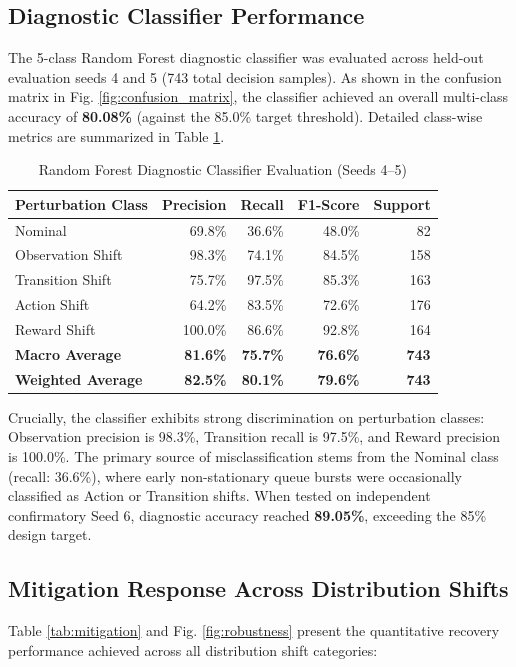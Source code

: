 \documentclass{ieeeaccess}
\begin{document}
\subsection{Diagnostic Classifier Performance}
The 5-class Random Forest diagnostic classifier was evaluated across held-out evaluation seeds 4 and 5 (743 total decision samples). As shown in the confusion matrix in Fig. \ref{fig:confusion_matrix}, the classifier achieved an overall multi-class accuracy of \textbf{80.08\%} (against the 85.0\% target threshold). Detailed class-wise metrics are summarized in Table \ref{tab:classification_report}.

\begin{table}[!t]
\centering
\caption{Random Forest Diagnostic Classifier Evaluation (Seeds 4--5)}
\label{tab:classification_report}
\scriptsize
\setlength{\tabcolsep}{2.5pt}
\begin{tabular}{lrrrr}
\toprule
\textbf{Perturbation Class} & \textbf{Precision} & \textbf{Recall} & \textbf{F1-Score} & \textbf{Support} \\
\midrule
Nominal & 69.8\% & 36.6\% & 48.0\% & 82 \\
Observation Shift & 98.3\% & 74.1\% & 84.5\% & 158 \\
Transition Shift & 75.7\% & 97.5\% & 85.3\% & 163 \\
Action Shift & 64.2\% & 83.5\% & 72.6\% & 176 \\
Reward Shift & 100.0\% & 86.6\% & 92.8\% & 164 \\
\midrule
\textbf{Macro Average} & \textbf{81.6\%} & \textbf{75.7\%} & \textbf{76.6\%} & \textbf{743} \\
\textbf{Weighted Average} & \textbf{82.5\%} & \textbf{80.1\%} & \textbf{79.6\%} & \textbf{743} \\
\bottomrule
\end{tabular}
\end{table}

Crucially, the classifier exhibits strong discrimination on perturbation classes: Observation precision is 98.3\%, Transition recall is 97.5\%, and Reward precision is 100.0\%. The primary source of misclassification stems from the Nominal class (recall: 36.6\%), where early non-stationary queue bursts were occasionally classified as Action or Transition shifts. When tested on independent confirmatory Seed 6, diagnostic accuracy reached \textbf{89.05\%}, exceeding the 85\% design target.

\subsection{Mitigation Response Across Distribution Shifts}
Table \ref{tab:mitigation} and Fig. \ref{fig:robustness} present the quantitative recovery performance achieved across all distribution shift categories:
\end{document}
